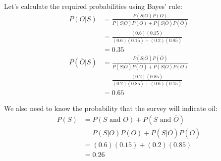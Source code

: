 \documentclass{beamer}\usepackage[]{graphicx}\usepackage[]{color}
\begin{document}
\begin{darkframes}
    \begin{frame}
      Let's calculate the required probabilities using Bayes' rule:
      \begin{align*}
        P(O|S) &= \frac{P(S|O)P(O)}{P(S|O)P(O) + P(S|\overline O)P(\overline O)} \\
        &= \frac{(0.6)(0.15)}{(0.6)(0.15) + (0.2)(0.85)} \\
        &= 0.35
      \end{align*}
      \begin{align*}
        P(\overline O|S) &= \frac{P(S|\overline O)P(\overline O)}{P(S|\overline O)P(\overline O) + P(S|O)P(O)} \\
        &= \frac{(0.2)(0.85)}{(0.2)(0.85) + (0.6)(0.15)} \\
        &= 0.65
      \end{align*}
    \end{frame}

    \begin{frame}
      We also need to know the probability that the survey will indicate oil:
      \begin{align*}
        P(S) &= P(\text{$S$ and $O$}) + P(\text{$S$ and $\overline O$}) \\
        &= P(S|O)P(O) + P(S|\overline O)P(\overline O) \\
        &= (0.6)(0.15) + (0.2)(0.85) \\
        &= 0.26
      \end{align*}
    \end{frame}


\end{darkframes}
\end{document}

